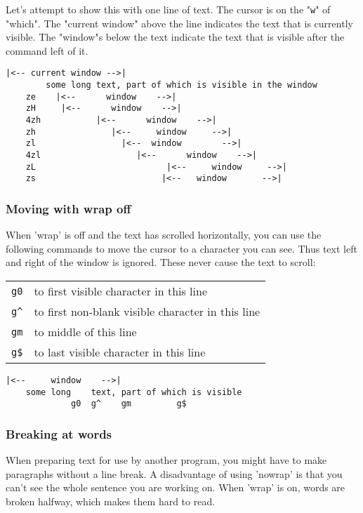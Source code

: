 Let's attempt to show this with one line of text.
The cursor is on the "\verb!w!" of "which".
The "current window" above the line indicates the text that is currently visible.
The "window"s below the text indicate the text that is visible after the command left of it.

\begin{Verbatim}[samepage=true]
                      |<-- current window -->|
        some long text, part of which is visible in the window 
    ze    |<--      window    -->|
    zH     |<--      window    -->|
    4zh           |<--      window    -->|
    zh               |<--     window     -->|
    zl                 |<--  window        -->|
    4zl                   |<--      window    -->|
    zL                          |<--     window     -->|
    zs                         |<--   window       -->|
\end{Verbatim}

\subsubsection{Moving with wrap off}
When 'wrap' is off and the text has scrolled horizontally, you can use the following commands to move the cursor to a character you can see.
Thus text left and right of the window is ignored.
These never cause the text to scroll:

\begin{center} \begin{tabular}{c l}
				\verb!g0! & to first visible character in this line \\
				\verb!g^! & to first non-blank visible character in this line \\
				\verb!gm! & to middle of this line \\
				\verb!g$! & to last visible character in this line \\
\end{tabular} \end{center}

\begin{Verbatim}[samepage=true]
            |<--     window    -->|
    some long    text, part of which is visible 
             g0  g^    gm         g$
\end{Verbatim}

\subsubsection{Breaking at words}
\label{edit-no-break}
When preparing text for use by another program, you might have to make paragraphs without a line break.
A disadvantage of using 'nowrap' is that you can't see the whole sentence you are working on.
When 'wrap' is on, words are broken halfway, which makes them hard to read.


